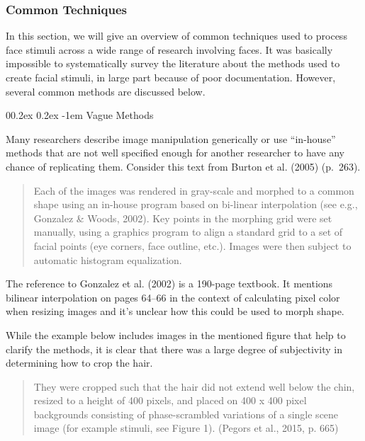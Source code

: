 \documentclass[
  doc,floatsintext]{apa6}
\makeatletter
\let\oldparagraph\paragraph
\renewcommand{\paragraph}[1]{\oldparagraph{#1}\mbox{}}
\renewcommand{\paragraph}{\@startsection{paragraph}{4}{\parindent}%
  {0\baselineskip \@plus 0.2ex \@minus 0.2ex}%
  {-1em}%
  {\normalfont\normalsize\bfseries\itshape\typesectitle}}
\makeatother
\begin{document}
\hypertarget{common-techniques}{%
\subsubsection{Common Techniques}\label{common-techniques}}

In this section, we will give an overview of common techniques used to process face stimuli across a wide range of research involving faces. It was basically impossible to systematically survey the literature about the methods used to create facial stimuli, in large part because of poor documentation. However, several common methods are discussed below.

\hypertarget{vague-methods}{%
\paragraph{Vague Methods}\label{vague-methods}}

Many researchers describe image manipulation generically or use ``in-house'' methods that are not well specified enough for another researcher to have any chance of replicating them. Consider this text from Burton et al. (2005) (p.~263).

\begin{quote}
Each of the images was rendered in gray-scale and morphed to a common shape using an in-house program based on bi-linear interpolation (see e.g., Gonzalez \& Woods, 2002). Key points in the morphing grid were set manually, using a graphics program to align a standard grid to a set of facial points (eye corners, face outline, etc.). Images were then subject to automatic histogram equalization.
\end{quote}

The reference to Gonzalez et al. (2002) is a 190-page textbook. It mentions bilinear interpolation on pages 64--66 in the context of calculating pixel color when resizing images and it's unclear how this could be used to morph shape.

While the example below includes images in the mentioned figure that help to clarify the methods, it is clear that there was a large degree of subjectivity in determining how to crop the hair.

\begin{quote}
They were cropped such that the hair did not extend well below the chin, resized to a height of 400 pixels, and placed on 400 x 400 pixel backgrounds consisting of phase-scrambled variations of a single scene image (for example stimuli, see Figure 1). (Pegors et al., 2015, p. 665)
\end{quote}
\end{document}
